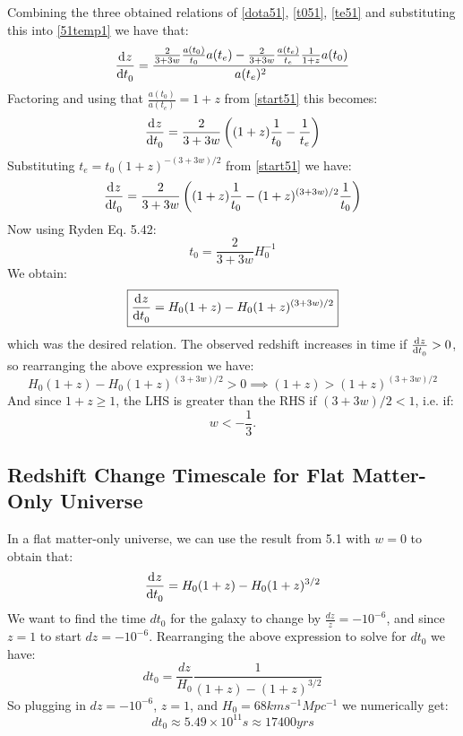 Combining the three obtained relations of \eqref{dota51}, \eqref{t051}, \eqref{te51} and substituting this into \eqref{51temp1} we have that:
\begin{equation}
    \dod{z}{t_0} = \frac{\frac{2}{3+3w}\frac{a(t_0)}{t_0}a(t_e) - \frac{2}{3+3w}\frac{a(t_e)}{t_e}\frac{1}{1+z}a(t_0)}{a(t_e)^2}
\end{equation}
Factoring and using that $\frac{a(t_0)}{a(t_e)} = 1 + z$ from \eqref{start51} this becomes:
\begin{equation}
    \dod{z}{t_0} = \frac{2}{3+3w}\left((1+z)\frac{1}{t_0} - \frac{1}{t_e}\right)
\end{equation}
Substituting $t_e = t_0 (1+z)^{-(3+3w)/2}$ from \eqref{start51} we have:
\begin{equation}
    \dod{z}{t_0} = \frac{2}{3+3w}\left((1+z)\frac{1}{t_0} - (1+z)^{(3+3w)/2}\frac{1}{t_0}\right)
\end{equation}
Now using Ryden Eq. 5.42:
\begin{equation}
    t_0 = \frac{2}{3 + 3w}H_0^{-1}
\end{equation}
We obtain:
\begin{equation}
    \boxed{\dod{z}{t_0} = H_0(1+z) - H_0(1+z)^{(3+3w)/2}}
\end{equation}
which was the desired relation. The observed redshift increases in time if $\od{z}{t_0} > 0$, so rearranging the above expression we have:
\begin{equation}
    H_0(1+z) - H_0(1+z)^{(3+3w)/2} > 0 \implies (1+z) > (1+z)^{(3+3w)/2}
\end{equation}
And since $1 + z \geq 1$, the LHS is greater than the RHS if $(3 + 3w)/2 < 1$, i.e. if:
\begin{equation}
    \boxed{w < -\frac{1}{3}}.
\end{equation}

\subsection{Redshift Change Timescale for Flat Matter-Only Universe}
In a flat matter-only universe, we can use the result from 5.1 with $w = 0$ to obtain that:
\begin{equation}
    \dod{z}{t_0} = H_0(1 + z) - H_0(1 + z)^{3/2}
\end{equation}
We want to find the time $dt_0$ for the galaxy to change by $\frac{dz}{z} = -10^{-6}$, and since $z = 1$ to start $dz = -10^{-6}$. Rearranging the above expression to solve for $dt_0$ we have:
\begin{equation}
    dt_0 = \frac{dz}{H_0}\frac{1}{(1+z)-(1+z)^{3/2}}
\end{equation}
So plugging in $dz = -10^{-6}$, $z = 1$, and $H_0 = 68 \si{km s^{-1}Mpc^{-1}}$ we numerically get:
\begin{equation}
    \boxed{dt_0 \approx 5.49 \times 10^{11}\si{s} \approx 17400\si{yrs}}
\end{equation}
